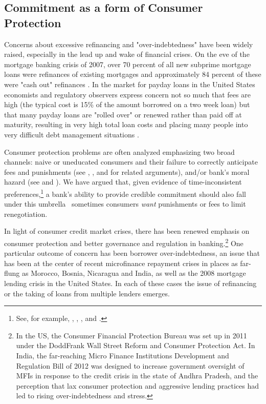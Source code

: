 \documentclass[11pt,english]{article}
\theoremstyle{plain}
\theoremstyle{definition}
\begin{document}
\subsection{Commitment as a form of Consumer Protection}

Concerns about excessive refinancing and "over-indebtedness" have
been widely raised, especially in the lead up and wake of financial crises.
On the eve of the mortgage banking crisis of 2007, over 70 percent
of all new subprime mortgage loans were refinances of existing mortgages
and approximately 84 percent of these were "cash out" refinances \citep{demyanyk2011}.
In the market for payday loans in the United States economists and
regulatory observers express concern not so much that fees are high
(the typical cost is 15\% of the amount borrowed on a two week loan)
but that many payday loans are "rolled over" or renewed
rather than paid off at maturity, resulting in very high total loan costs and placing
many people into very difficult debt management situations \citep{deyoung2015}.

Consumer protection problems are often analyzed emphasizing two
broad channels: naive or uneducated consumers and their failure to correctly
anticipate fees and punishments (see \citet{gabaix2006},
\citet{armstrong2012}, and \citet{akerlof2015} for related arguments),
and/or bank's moral hazard (see \citet{dewatripont1999} and \citet{oak2010}).
We have argued that, given evidence of time-inconsistent
preferences,\footnote{See, for example, \citet{laibson2003}, \citet{ashraf2006},
\citet{gugerty2007}, and \citet{tanaka2010}.} a bank's ability to provide credible commitment should also fall
under this umbrella \textendash\  sometimes consumers \textit{want} punishments
or fees to limit renegotiation.

In light of consumer credit
market crises, there has been renewed emphasis on consumer protection and
better governance and regulation in banking.\footnote{In the US, the Consumer Financial Protection Bureau was set up in
2011 under the Dodd\textendash Frank Wall Street Reform and Consumer
Protection Act. In India, the far-reaching Micro Finance Institutions
Development and Regulation Bill of 2012 was designed to increase government
oversight of MFIs in response to the credit crisis in the state of
Andhra Pradesh, and the perception that lax consumer protection and
aggressive lending practices had led to rising over-indebtedness and
stress.} One particular outcome of concern has been borrower over-indebtedness,
an issue that has been at the center of recent microfinance repayment
crises in places as far-flung as Morocco, Bosnia, Nicaragua and India,
as well as the 2008 mortgage lending crisis in the United States.
In each of these cases the issue of refinancing or the taking of loans
from multiple lenders emerges.
\end{document}
